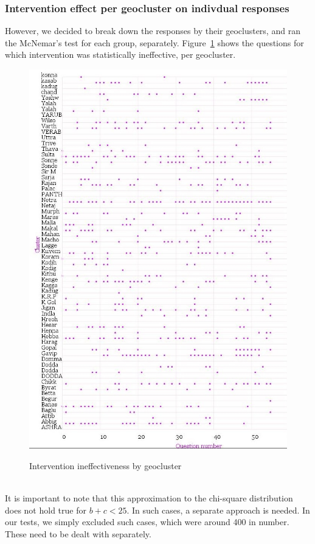 \documentclass[10pt]{article}
\begin{document}
\subsubsection{Intervention effect per geocluster on indivdual responses}
However, we decided to break down the responses by their geoclusters, and ran the McNemar's test for each group, separately. Figure~\ref{McNemarUnaffectedQuestions} shows the questions for which intervention was statistically ineffective, per geocluster.\\
\begin{figure}
\caption{Intervention ineffectiveness by geocluster}
\label{McNemarUnaffectedQuestions}
\begin{center}
\includegraphics[width=120mm]{ReportMedia/McNemarUnaffectedQuestions.jpg}\\
\end{center}
\end{figure}\\
It is important to note that this approximation to the chi-square distribution does not hold true for $b+c<25$. In such cases, a separate approach is needed. In our tests, we simply excluded such cases, which were around 400 in number. These need to be dealt with separately.
\end{document}
